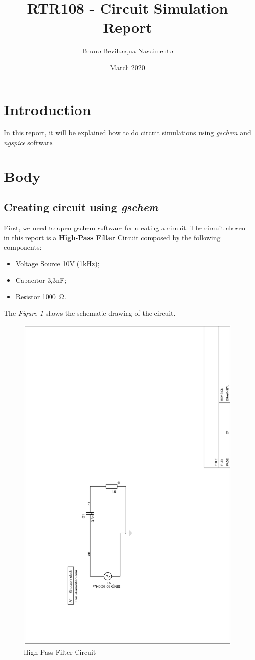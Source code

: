 \documentclass{article}
\title{RTR108 - Circuit Simulation Report}
\author{Bruno Bevilacqua Nascimento}
\date{March 2020}
\begin{document}
\maketitle

\section{Introduction}

In this report, it will be explained how to do circuit simulations using \textit{gschem} and \textit{ngspice} software.

\section{Body}

\subsection{Creating circuit using \textit{gschem}}

First, we need to open gschem software for creating a circuit. The circuit chosen in this report is a \textbf{High-Pass Filter} Circuit composed by the following components: \break

\begin{itemize}
\item  Voltage Source 10V (1kHz);
\item  Capacitor 3,3nF;
\item  Resistor \SI{1000}{\ohm}. 
\end{itemize} 

The \textit{Figure 1} shows the schematic drawing of the circuit.

\begin{figure}[H]
\centering
\includegraphics[width=1\textwidth, height=1\textwidth, angle =-90]{01}
\caption{High-Pass Filter Circuit}
\end{figure}
\end{document}
